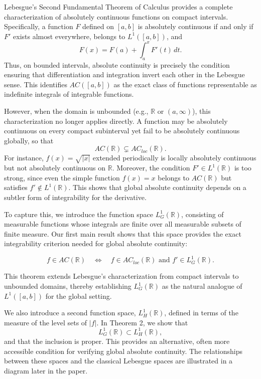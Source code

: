 \documentclass{article}
\numberwithin{equation}{section}
{\theoremstyle{break}\newtheorem{theorem}{Theorem}[subsection]}
{\theoremstyle{break}\theorembodyfont{\rmfamily}\newtheorem{example}[theorem]{Example}}
{\theoremstyle{break}\theorembodyfont{\rmfamily}\newtheorem{definition}[theorem]{Definition}}
{\theoremstyle{break}\theorembodyfont{\rmfamily}\newtheorem{notation}[theorem]{Notation}}
{\theoremstyle{break}\theorembodyfont{\rmfamily}\newtheorem{remark}[theorem]{Remark}}
\begin{document}
Lebesgue's Second Fundamental Theorem of Calculus provides a complete characterization of
absolutely continuous functions on compact intervals. Specifically, a function $F$ defined
on $[a,b]$ is absolutely continuous if and only if $F'$ exists almost everywhere, belongs
to $L^1([a,b])$, and
\[
F(x) = F(a) + \int_a^x F'(t)\, dt.
\]
Thus, on bounded intervals, absolute continuity is precisely the condition ensuring that
differentiation and integration invert each other in the Lebesgue sense. This identifies
$AC([a,b])$ as the exact class of functions representable as indefinite integrals of
integrable functions.

However, when the domain is unbounded (e.g., $\mathbb{R}$ or $(a,\infty)$), this
characterization no longer applies directly. A function may be absolutely continuous on
every compact subinterval yet fail to be absolutely continuous globally, so that
\[
AC(\mathbb{R}) \subsetneq AC_{loc}(\mathbb{R}).
\]
For instance, $f(x)=\sqrt{|x|}$ extended periodically is locally absolutely continuous but
not absolutely continuous on $\mathbb{R}$. Moreover, the condition $F' \in L^1(\mathbb{R})$
is too strong, since even the simple function $f(x)=x$ belongs to $AC(\mathbb{R})$ but
satisfies $f' \notin L^1(\mathbb{R})$. This shows that global absolute continuity depends on
a subtler form of integrability for the derivative.

To capture this, we introduce the function space $L^1_G(\mathbb{R})$, consisting of
measurable functions whose integrals are finite over all measurable subsets of finite
measure. Our first main result shows that this space provides the exact integrability
criterion needed for global absolute continuity:

\[
f \in AC(\mathbb{R}) \quad \Longleftrightarrow \quad f \in AC_{loc}(\mathbb{R}) \text{ and } f' \in L^1_G(\mathbb{R}).
\]

This theorem extends Lebesgue’s characterization from compact intervals to unbounded
domains, thereby establishing $L^1_G(\mathbb{R})$ as the natural analogue of $L^1([a,b])$
for the global setting.

We also introduce a second function space, $L^1_H(\mathbb{R})$, defined in terms of the
measure of the level sets of $|f|$. In Theorem 2, we show that
\[
L^1_G(\mathbb{R}) \subset L^1_H(\mathbb{R}),
\]
and that the inclusion is proper. This provides an alternative, often more accessible
condition for verifying global absolute continuity. The relationships between these spaces
and the classical Lebesgue spaces are illustrated in a diagram later in the paper.
\end{document}
